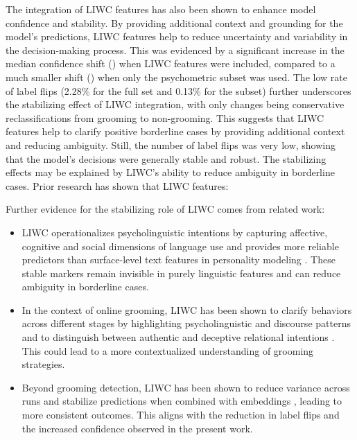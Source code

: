 The integration of LIWC features has also been shown to enhance model confidence and stability. By providing additional context and grounding for the model's predictions, LIWC features help to reduce uncertainty and variability in the decision-making process. This was evidenced by a significant increase in the median confidence shift (\Delta \mu {}) when LIWC features were included, compared to a much smaller shift (\Delta \mu {}) when only the psychometric subset was used. The low rate of label flips (2.28\% for the full set and 0.13\% for the subset) further underscores the stabilizing effect of LIWC integration, with only changes being conservative reclassifications from grooming to non-grooming. This suggests that LIWC features help to clarify positive borderline cases by providing additional context and reducing ambiguity. Still, the number of label flips was very low, showing that the model's decisions were generally stable and robust. The stabilizing effects may be explained by LIWC’s ability to reduce ambiguity in borderline cases. Prior research has shown that LIWC features:

Further evidence for the stabilizing role of LIWC comes from related work:

\begin{itemize}
    \item LIWC operationalizes psycholinguistic intentions by capturing affective, cognitive and social dimensions of language use \cite{pennebaker2022liwc} and provides more reliable predictors than surface-level text features in personality modeling \cite{farnadi2018user}. These stable markers remain invisible in purely linguistic features and can reduce ambiguity in borderline cases.
    \item In the context of online grooming, LIWC has been shown to clarify behaviors across different stages by highlighting psycholinguistic and discourse patterns \cite{Cano2014} and to distinguish between authentic and deceptive relational intentions \cite{broome2020psycholinguistic}. This could lead to a more contextualized understanding of grooming strategies.
    \item Beyond grooming detection, LIWC has been shown to reduce variance across runs and stabilize predictions when combined with embeddings \cite{mehta2020bottomup}, leading to more consistent outcomes. This aligns with the reduction in label flips and the increased confidence observed in the present work.
\end{itemize}

